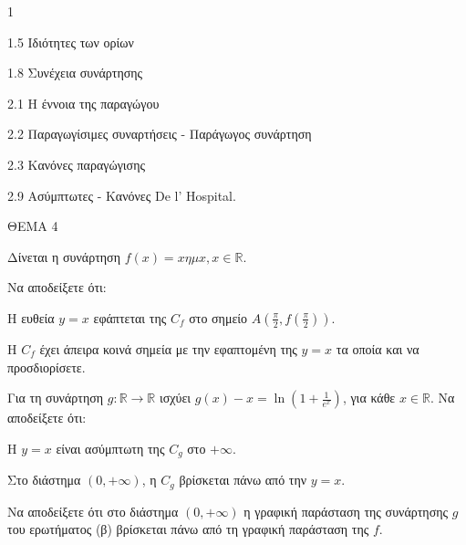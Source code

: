 \begin{ylh}{1}
    \item 1.5 Ιδιότητες των ορίων
    \item 1.8 Συνέχεια συνάρτησης
    \item 2.1 Η έννοια της παραγώγου
    \item 2.2 Παραγωγίσιμες συναρτήσεις - Παράγωγος συνάρτηση
    \item 2.3 Κανόνες παραγώγισης
    \item 2.9 Ασύμπτωτες - Κανόνες De l’ Hospital.
\end{ylh}
ΘΕΜΑ 4

Δίνεται η συνάρτηση $f(x) = x \eta \mu x, x \in \mathbb{R}$.
\begin{alist}
\item Να αποδείξετε ότι:
    \begin{rlist}
    \item Η ευθεία $y=x$ εφάπτεται της $C_f$ στο σημείο $A\left(\frac{\pi}{2},f\left(\frac{\pi}{2}\right)\right)$. 
    \item Η $C_f$ έχει άπειρα κοινά σημεία με την εφαπτομένη της $y=x$ τα οποία και να προσδιορίσετε. 
    \end{rlist}
\item Για τη συνάρτηση $g: \mathbb{R} \rightarrow \mathbb{R}$ ισχύει $g(x)-x = \ln\left(1+\frac{1}{e^x}\right)$, για κάθε $x \in \mathbb{R}$. Να αποδείξετε ότι:
    \begin{rlist}
    \item Η $y=x$ είναι ασύμπτωτη της $C_g$ στο $+\infty$. 
    \item Στο διάστημα $(0,+\infty)$, η $C_g$ βρίσκεται πάνω από την $y=x$. 
    \end{rlist}
\item Να αποδείξετε ότι στο διάστημα $(0,+\infty)$ η γραφική παράσταση της συνάρτησης $g$ του ερωτήματος (β) βρίσκεται πάνω από τη γραφική παράσταση της $f$. 
\end{alist}